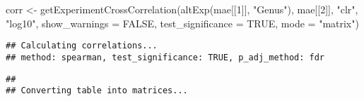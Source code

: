 \documentclass[
  oneside]{book}
\newenvironment{Shaded}{\begin{snugshade}}{\end{snugshade}}
\newcommand{\AttributeTok}[1]{\textcolor[rgb]{0.77,0.63,0.00}{#1}}
\newcommand{\ConstantTok}[1]{\textcolor[rgb]{0.00,0.00,0.00}{#1}}
\newcommand{\DecValTok}[1]{\textcolor[rgb]{0.00,0.00,0.81}{#1}}
\newcommand{\FunctionTok}[1]{\textcolor[rgb]{0.00,0.00,0.00}{#1}}
\newcommand{\NormalTok}[1]{#1}
\newcommand{\OtherTok}[1]{\textcolor[rgb]{0.56,0.35,0.01}{#1}}
\newcommand{\SpecialCharTok}[1]{\textcolor[rgb]{0.00,0.00,0.00}{#1}}
\newcommand{\StringTok}[1]{\textcolor[rgb]{0.31,0.60,0.02}{#1}}
\begin{document}
\begin{Shaded}
\begin{Highlighting}[]
\NormalTok{corr }\OtherTok{\textless{}{-}} \FunctionTok{getExperimentCrossCorrelation}\NormalTok{(}\FunctionTok{altExp}\NormalTok{(mae[[}\DecValTok{1}\NormalTok{]], }\StringTok{"Genus"}\NormalTok{), }
\NormalTok{                                      mae[[}\DecValTok{2}\NormalTok{]], }
                                      \StringTok{"clr"}\NormalTok{, }
                                      \StringTok{"log10"}\NormalTok{, }
                                      \AttributeTok{show\_warnings =} \ConstantTok{FALSE}\NormalTok{,}
                                      \AttributeTok{test\_significance =} \ConstantTok{TRUE}\NormalTok{,}
                                      \AttributeTok{mode =} \StringTok{"matrix"}\NormalTok{)}
\end{Highlighting}
\end{Shaded}

\begin{verbatim}
## Calculating correlations...
## method: spearman, test_significance: TRUE, p_adj_method: fdr
\end{verbatim}

\begin{verbatim}
## 
## Converting table into matrices...
\end{verbatim}

\begin{Shaded}
\end{Shaded}
\end{document}
